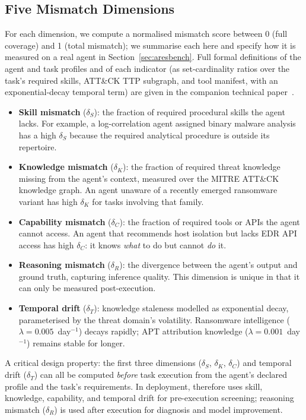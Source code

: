 \subsection{Five Mismatch Dimensions}

For each dimension, we compute a normalised mismatch score between 0 (full
coverage) and 1 (total mismatch); we summarise each here and specify how it
is measured on a real agent in Section~\ref{sec:aresbench}. Full formal definitions of the
agent and task profiles and of each indicator (as set-cardinality ratios
over the task's required skills, ATT\&CK TTP subgraph, and tool manifest,
with an exponential-decay temporal term) are given in the companion
technical paper~\cite{alam2026ares}.

\begin{itemize}[noitemsep, leftmargin=*]
  \item \textbf{Skill mismatch} ($\delta_S$): the fraction of required
    procedural skills the agent lacks. For example, a log-correlation agent
    assigned binary malware analysis has a high $\delta_S$ because the
    required analytical procedure is outside its repertoire.
  \item \textbf{Knowledge mismatch} ($\delta_K$): the fraction of required
    threat knowledge missing from the agent's context, measured over the
    MITRE ATT\&CK~\cite{strom2022} knowledge graph. An agent unaware of a
    recently emerged ransomware variant has high $\delta_K$ for tasks
    involving that family.
  \item \textbf{Capability mismatch} ($\delta_C$): the fraction of
    required tools or APIs the agent cannot access. An agent that recommends
    host isolation but lacks EDR API access has high $\delta_C$: it knows
    \textit{what} to do but cannot \textit{do} it.
  \item \textbf{Reasoning mismatch} ($\delta_R$): the divergence between
    the agent's output and ground truth, capturing inference quality. This
    dimension is unique in that it can only be measured post-execution.
  \item \textbf{Temporal drift} ($\delta_T$): knowledge staleness modelled
    as exponential decay, parameterised by the threat domain's volatility.
    Ransomware intelligence ($\lambda = 0.005$~day$^{-1}$) decays rapidly;
    APT attribution knowledge ($\lambda = 0.001$~day$^{-1}$) remains stable
    for longer.
\end{itemize}

A critical design property: the first three dimensions ($\delta_S$,
$\delta_K$, $\delta_C$) and temporal drift ($\delta_T$) can all be computed
\textit{before} task execution from the agent's declared profile and the
task's requirements. In deployment, \ARES{} therefore uses skill,
knowledge, capability, and temporal drift for pre-execution
screening; reasoning mismatch ($\delta_R$) is used after execution
for diagnosis and model improvement.

